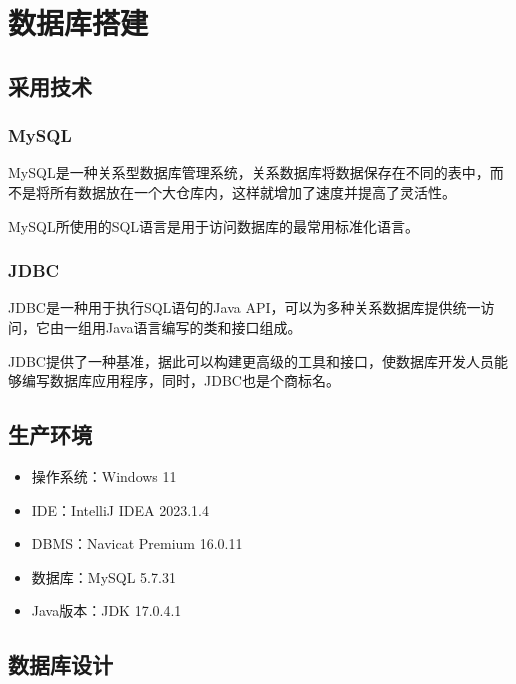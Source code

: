 \documentclass[UTF8,12pt]{article}
\begin{document}
\newpage

\section{数据库搭建}
\subsection{采用技术}
\subsubsection{MySQL}
MySQL是一种关系型数据库管理系统，关系数据库将数据保存在不同的表中，而不是将所有数据放在一个大仓库内，这样就增加了速度并提高了灵活性。

MySQL所使用的SQL语言是用于访问数据库的最常用标准化语言。

\subsubsection{JDBC}
JDBC是一种用于执行SQL语句的Java API，可以为多种关系数据库提供统一访问，它由一组用Java语言编写的类和接口组成。

JDBC提供了一种基准，据此可以构建更高级的工具和接口，使数据库开发人员能够编写数据库应用程序，同时，JDBC也是个商标名。

\subsection{生产环境}
\begin{itemize}
    \item 操作系统：Windows 11
    \item IDE：IntelliJ IDEA 2023.1.4
    \item DBMS：Navicat Premium 16.0.11
    \item 数据库：MySQL 5.7.31
    \item Java版本：JDK 17.0.4.1
\end{itemize}

\subsection{数据库设计}
\end{document}
